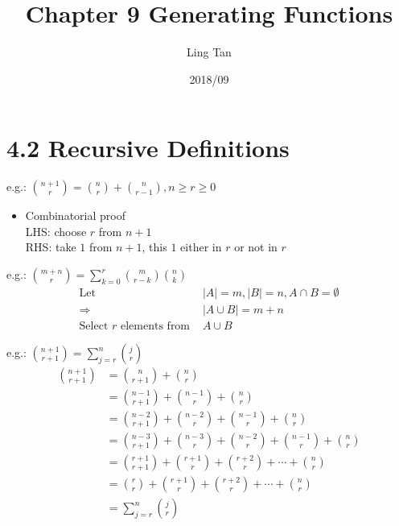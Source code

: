 \documentclass[a4paper]{article}
\title{Chapter 9 Generating Functions}
\author{Ling Tan}
\date{2018/09}
\begin{document}
\maketitle

\section*{4.2 Recursive Definitions}
\color{red}e.g.: \color{black} $\binom{n+1}{r}=\binom{n}{r}+\binom{n}{r-1}, n\geq r\geq 0$
\begin{itemize}
    \item Combinatorial proof \\
    LHS: choose $r$ from $n+1$\\
    RHS: take $1$ from $n+1$, this $1$ either in $r$ or not in $r$\\
\end{itemize}

\color{red}e.g.: \color{black} $\binom{m+n}{r}=\sum_{k=0}^{r}{\binom{m}{r-k}\binom{n}{k}}$
\begin{align*}
\text{Let }&|A|=m,|B|=n,A\cap B=\emptyset\\
\Rightarrow& |{A \cup B}|=m+n\\
\text{Select $r$ elements from }& {A \cup B}
\end{align*}

\color{red}e.g.: \color{black}$\binom{n+1}{r+1}=\sum_{j=r}^{n}{\binom{j}{r}}$
\begin{align*}
\binom{n+1}{r+1}&=\binom{n}{r+1}+\binom{n}{r}\\
&=\binom{n-1}{r+1}+\binom{n-1}{r}+\binom{n}{r}\\
&=\binom{n-2}{r+1}+\binom{n-2}{r}+\binom{n-1}{r}+\binom{n}{r}\\
&=\binom{n-3}{r+1}+\binom{n-3}{r}+\binom{n-2}{r}+\binom{n-1}{r}+\binom{n}{r}\\
&=\binom{r+1}{r+1}+\binom{r+1}{r}+\binom{r+2}{r}+\cdots+\binom{n}{r}\\
&=\binom{r}{r}+\binom{r+1}{r}+\binom{r+2}{r}+\cdots+\binom{n}{r}\\
&=\sum_{j=r}^{n}{\binom{j}{r}}
\end{align*}
\end{document}

